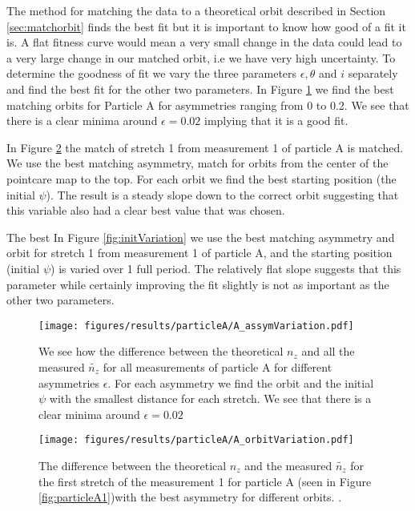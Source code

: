  The method for matching the data to a theoretical orbit described in Section \ref{sec:matchorbit} finds the best fit but it is important to know how good of a fit it is. A flat fitness curve would mean a very small change in the data could lead to a very large change in our matched orbit, i.e we have very high uncertainty. To determine the goodness of fit we vary the three parameters $\epsilon, \theta$ and $i$ separately and find the best fit for the other two parameters. In Figure \ref{fig:asymVariation} we find the best matching orbits for Particle A for asymmetries ranging from 0 to 0.2. We see that there is a clear minima around $\epsilon = 0.02$ implying that it is a good fit.
 
 In Figure \ref{fig:orbitVariation} the match of stretch 1 from measurement 1 of particle A is matched. We use the best matching asymmetry, match for orbits from the center of the pointcare map to the top. For each orbit we find the best starting position (the initial $\psi$). The result is a steady slope down to the correct orbit suggesting that this variable also had a clear best value that was chosen. 
 
 The best In Figure \ref{fig:initVariation} we use the best matching 		asymmetry and orbit for stretch 1 from measurement 1 of particle A, and the starting position (initial $\psi$) is varied over 1 full period. The relatively flat slope suggests that this parameter while certainly improving the fit slightly is not as important as the other two parameters. 
 
 \begin{figure}[H]
 \begin{center}
 \texttt{[image: figures/results/particleA/A\_assymVariation.pdf]}
 \end{center}
 \caption{We see how the difference between the theoretical $n_z$ and all the measured  $\widetilde{n_z}$ for all measurements of particle A for different asymmetries $\epsilon$. For each asymmetry we find the orbit and the initial $\psi$ with the smallest distance for each stretch. We see that there is a clear minima around $\epsilon = 0.02$}
 \label{fig:asymVariation}
 \end{figure}
 
 \begin{figure}[H]
 \begin{center}
 \texttt{[image: figures/results/particleA/A\_orbitVariation.pdf]}
 \end{center}
 \caption{The difference between the theoretical $n_z$ and the measured $\widetilde{n_z}$ for the first stretch of the measurement 1 for particle A (seen in Figure \ref{fig:particleA1})with the best asymmetry for different orbits. .}
 \label{fig:orbitVariation}
 \end{figure}
 
